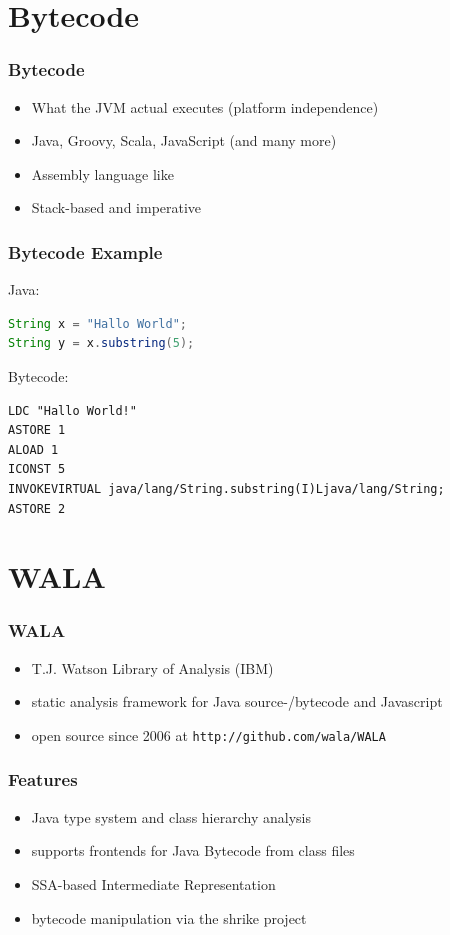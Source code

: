 \documentclass{beamer}
\begin{document}
\section{Bytecode}

\frame{\sectionpage}

\begin{frame}
   \frametitle{Bytecode}
   \begin{itemize}
      \item What the JVM actual executes (platform independence)
      \item Java, Groovy, Scala, JavaScript (and many more)
      \item Assembly language like 
      \item Stack-based and imperative
   \end{itemize}    
\end{frame}


\begin{frame}[fragile]
  \frametitle{Bytecode Example}
  Java:
  \begin{lstlisting}[language=Java]
String x = "Hallo World";
String y = x.substring(5);
  \end{lstlisting}%
  Bytecode:
  \begin{lstlisting}[language=Bytecode]
LDC "Hallo World!"
ASTORE 1
ALOAD 1
ICONST 5
INVOKEVIRTUAL java/lang/String.substring(I)Ljava/lang/String;
ASTORE 2
  \end{lstlisting}  
\end{frame}

\section{WALA}

\frame{\sectionpage}

\begin{frame}
  \frametitle{WALA}
  \begin{itemize}
    \item T.J. Watson Library of Analysis (IBM)
    \item static analysis framework for Java source-/bytecode and Javascript
    \item open source since 2006 at \texttt{http://github.com/wala/WALA}
  \end{itemize}

\end{frame}


\begin{frame}
  \frametitle{Features}
  
  \begin{itemize}
    \item Java type system and class hierarchy analysis
    \item supports frontends for Java Bytecode from class files
    \item SSA-based Intermediate Representation
    \item bytecode manipulation via the shrike project
  \end{itemize}
  
\end{frame}
\end{document}

